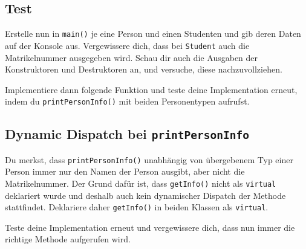 

\subsection{Test}
Erstelle nun in \lstinline{main()} je eine Person und einen Studenten und gib deren Daten auf der Konsole aus.
Vergewissere dich, dass bei \lstinline{Student} auch die Matrikelnummer ausgegeben wird.
Schau dir auch die Ausgaben der Konstruktoren und Destruktoren an, und versuche, diese nachzuvollziehen.

Implementiere dann folgende Funktion und teste deine Implementation erneut, indem du \lstinline{printPersonInfo()} mit beiden Personentypen aufrufst.




\subsection{Dynamic Dispatch bei \lstinline{printPersonInfo}}
Du merkst, dass \lstinline{printPersonInfo()} unabhängig von übergebenem Typ einer Person immer nur den Namen der Person ausgibt, aber nicht die Matrikelnummer.
Der Grund dafür ist, dass \lstinline{getInfo()} nicht als \lstinline{virtual} deklariert wurde und deshalb auch kein dynamischer Dispatch der Methode stattfindet.
Deklariere daher \lstinline{getInfo()} in beiden Klassen als \lstinline{virtual}.

Teste deine Implementation erneut und vergewissere dich, dass nun immer die richtige Methode aufgerufen wird.


